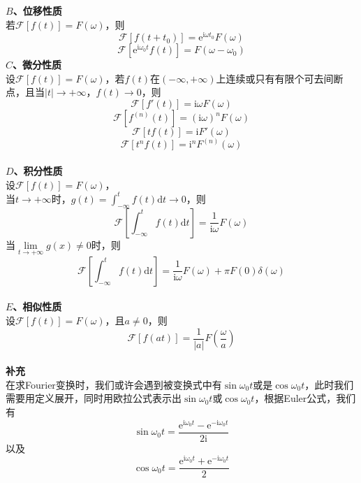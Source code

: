 \documentclass[12pt, a4paper, twoside]{ctexbook}
\begin{document}
\textbf{$B$、位移性质}\\
若$\mathscr{F}\left[f\left(t\right)\right]=F\left(\omega\right)$，则
$$
\mathscr{F}\left[ f\left( t + t_0 \right) \right] =\text{e}^{\text{i}\omega t_0}F\left( \omega \right) 
$$
$$
\mathscr{F}\left[ \text{e}^{\text{i}\omega_0 t}f\left( t \right) \right] =F\left( \omega -\omega _0 \right)
$$
\newpage
\textbf{$C$、微分性质}\\
设$\mathscr{F}\left[f\left(t\right)\right]=F\left(\omega\right)$，若$f\left(t\right)$在$\left(-\infty,+\infty\right)$上连续或只有有限个可去间断点，且当$\left| t \right|\rightarrow +\infty $，$f \left(t\right) \rightarrow 0 $，则
$$
\mathscr{F}\left[ f'\left( t \right) \right] =\text{i}\omega F\left( \omega \right) 
$$
$$
\mathscr{F}\left[ f^{\left( n \right)}\left( t \right) \right] =\left( \text{i}\omega \right) ^nF\left( \omega \right) 
$$
$$
\mathscr{F}\left[ tf\left( t \right) \right] = \text{i}F'\left( \omega \right)
$$
$$
\mathscr{F}\left[ t^nf\left( t \right) \right] = \text{i}^nF^{\left( n \right)}\left( \omega \right)
$$
~\\

\textbf{$D$、积分性质}\\
设$\mathscr{F}\left[f\left(t\right)\right]=F\left(\omega\right)$，\\
当$t\to+\infty$时，$g\left(t\right)=\int_{-\infty}^{t}{f\left(t\right)\mathrm{d}t}\to0$，则
$$
\mathscr{F}\left[ \int_{-\infty}^t{f\left( t \right) \text{d}t} \right] =\frac{1}{\text{i}\omega}F\left( \omega \right) 
$$
当$\underset{t\to+\infty}{\lim}{g\left(x\right)\ne0}$时，则
$$
\mathscr{F}\left[ \int_{-\infty}^t{f\left( t \right) \text{d}t} \right] =\frac{1}{\text{i}\omega}F\left( \omega \right) +\pi F\left( 0 \right) \delta \left( \omega \right) 
$$
~\\

\textbf{$E$、相似性质}\\
设$\mathscr{F}\left[f\left(t\right)\right]=F\left(\omega\right)$，且$a\ne0$，则
$$
\mathscr{F}\left[ f\left( at \right) \right] =\frac{1}{\left| a \right|}F\left( \frac{\omega}{a} \right) 
$$
~\\

\textbf{补充}\\
在求Fourier变换时，我们或许会遇到被变换式中有$\sin {\omega_0 t}$或是$\cos {\omega_0 t}$，此时我们需要用定义展开，同时用欧拉公式表示出$\sin {\omega_0 t}$或$\cos {\omega_0 t}$，根据Euler公式，我们有
$$
\sin {\omega_0 t} = \frac{\mathrm{e}^{\mathrm{i}\omega_0 t}-\mathrm{e}^{-\mathrm{i}\omega_0 t}}{2\mathrm{i}}
$$
以及
$$
\cos {\omega_0 t} = \frac{\mathrm{e}^{\mathrm{i}\omega_0 t}+\mathrm{e}^{-\mathrm{i}\omega_0 t}}{2}
$$
\end{document}
